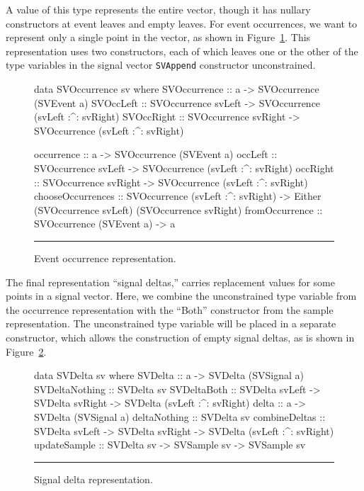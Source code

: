 \documentclass[draft]{llncs}
\begin{document}
A value of this type represents the entire vector, though it has nullary
constructors at event leaves and empty leaves. For event occurrences, we want
to represent only a single point in the vector, as shown in Figure~\ref{figure:event_occurrence_representation}.
This representation uses two constructors, each of which leaves one or the
other of the type variables in the signal vector {\tt SVAppend} constructor
unconstrained.

\begin{figure}[t]
\begin{code}
data SVOccurrence sv where
  SVOccurrence :: a -> SVOccurrence (SVEvent a)
  SVOccLeft    :: SVOccurrence svLeft
                  -> SVOccurrence (svLeft :^: svRight)
  SVOccRight   :: SVOccurrence svRight
                  -> SVOccurrence (svLeft :^: svRight)

occurrence        :: a -> SVOccurrence (SVEvent a)
occLeft           :: SVOccurrence svLeft
                     -> SVOccurrence (svLeft :^: svRight)
occRight          :: SVOccurrence svRight
                     -> SVOccurrence (svLeft :^: svRight)
chooseOccurrences :: SVOccurrence (svLeft :^: svRight)
                     -> Either (SVOccurrence svLeft) (SVOccurrence svRight)
fromOccurrence    :: SVOccurrence (SVEvent a) -> a
\end{code}
\hrule
\caption{Event occurrence representation.}
\label{figure:event_occurrence_representation}
\end{figure}

The final representation ``signal deltas,'' carries replacement values for some
points in a signal vector. Here, we combine the unconstrained type variable
from the occurrence representation with the ``Both'' constructor from the sample
representation. The unconstrained type variable will be placed in a separate
constructor, which allows the construction of empty signal deltas, as is shown
in Figure~\ref{figure:signal_delta_representation}.

\begin{figure}[t]
\begin{code}
data SVDelta sv where
  SVDelta        :: a -> SVDelta (SVSignal a)
  SVDeltaNothing :: SVDelta sv
  SVDeltaBoth    :: SVDelta svLeft -> SVDelta svRight
                    -> SVDelta (svLeft :^: svRight)
delta         :: a -> SVDelta (SVSignal a)
deltaNothing  :: SVDelta sv
combineDeltas :: SVDelta svLeft -> SVDelta svRight
                 -> SVDelta (svLeft :^: svRight)
updateSample  :: SVDelta sv -> SVSample sv -> SVSample sv
\end{code}
\hrule
\caption{Signal delta representation.}
\label{figure:signal_delta_representation}
\end{figure}
\end{document}
